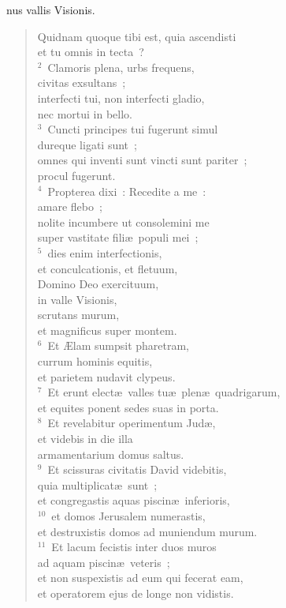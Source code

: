 \bchapter
{}nus vallis Visionis. \begin{verse}Quidnam quoque tibi est, quia ascendisti\\ et tu omnis in tecta~?\\
${}^{2}$~Clamoris plena, urbs frequens,\\ civitas exsultans~;\\ interfecti tui, non interfecti gladio,\\ nec mortui in bello.\\
${}^{3}$~Cuncti principes tui fugerunt simul\\ dureque ligati sunt~;\\ omnes qui inventi sunt vincti sunt pariter~;\\ procul fugerunt.\\
${}^{4}$~Propterea dixi~: Recedite a me~:\\ amare flebo~;\\ nolite incumbere ut consolemini me\\ super vastitate fili\ae\ populi mei~;\\
${}^{5}$~dies enim interfectionis,\\ et conculcationis, et fletuum,\\ Domino Deo exercituum,\\ in valle Visionis,\\ scrutans murum,\\ et magnificus super montem.\\
${}^{6}$~Et \AE lam sumpsit pharetram,\\ currum hominis equitis,\\ et parietem nudavit clypeus.\\
${}^{7}$~Et erunt elect\ae\ valles tu\ae\ plen\ae\ quadrigarum,\\ et equites ponent sedes suas in porta.\\
${}^{8}$~Et revelabitur operimentum Jud\ae ,\\ et videbis in die illa\\ armamentarium domus saltus.\\
${}^{9}$~Et scissuras civitatis David videbitis,\\ quia multiplicat\ae\ sunt~;\\ et congregastis aquas piscin\ae\ inferioris,\\
${}^{10}$~et domos Jerusalem numerastis,\\ et destruxistis domos ad muniendum murum.\\
${}^{11}$~Et lacum fecistis inter duos muros\\ ad aquam piscin\ae\ veteris~;\\ et non suspexistis ad eum qui fecerat eam,\\ et operatorem ejus de longe non vidistis.\\

\end{verse}
